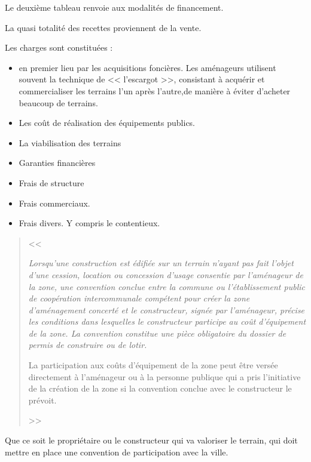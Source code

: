 			Le deuxième tableau renvoie aux modalités de financement.

			La quasi totalité des recettes proviennent de la vente.

			Les charges sont constituées :
			\begin{itemize}
				\item en premier lieu par les acquisitions foncières.
				Les aménageurs utilisent souvent la technique de << l'escargot >>, consistant à acquérir et commercialiser les terrains l'un après l'autre,de manière à éviter d'acheter beaucoup de terrains.

				\item Les coût de réalisation des équipements publics.

				\item La viabilisation des terrains

				\item Garanties financières

				\item Frais de structure

				\item Frais commerciaux.

				\item Frais divers. Y compris le contentieux.
			\end{itemize}

		\begin{quote}
			<< \lips

			{\itshape Lorsqu'une construction est édifiée sur un terrain n'ayant pas fait l'objet d'une cession, location ou concession d'usage consentie par l'aménageur de la zone, une convention conclue entre la commune ou l'établissement public de coopération intercommunale compétent pour créer la zone d'aménagement concerté et le constructeur, signée par l'aménageur, précise les conditions dans lesquelles le constructeur participe au coût d'équipement de la zone. La convention constitue une pièce obligatoire du dossier de permis de construire ou de lotir.

				\medskip La participation aux coûts d'équipement de la zone peut être versée directement à l'aménageur ou à la personne publique qui a pris l'initiative de la création de la zone si la convention conclue avec le constructeur le prévoit.}

			\lips >>
		\end{quote}
		Que ce soit le propriétaire ou le constructeur qui va valoriser le terrain, qui doit mettre en place une convention de participation avec la ville.

